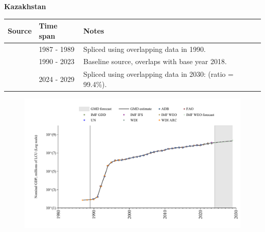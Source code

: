 \documentclass[12pt,a4paper,landscape]{article}
\begin{document}
\begin{adjustbox}{max totalsize={\paperwidth}{\paperheight},center}
\begin{minipage}[t][\textheight][t]{\textwidth}
\vspace*{0.5cm}
{}
\begin{center}
{\Large\bfseries Kazakhstan}
\end{center}
\vspace{0.5cm}
\begin{table}[H]
\centering
\small
\begin{tabular}{|l|l|l|}
\hline
\textbf{Source} & \textbf{Time span} & \textbf{Notes} \\
\hline
\rowcolor{white}\cite{WDI_ARC}& 1987 - 1989 &Spliced using overlapping data in 1990.\\
\rowcolor{lightgray}\cite{WDI}& 1990 - 2023 &Baseline source, overlaps with base year 2018.\\
\rowcolor{white}\cite{IMF_WEO_forecast}& 2024 - 2029 &Spliced using overlapping data in 2030: (ratio = 99.4\%).\\
\hline
\end{tabular}
\end{table}
\begin{figure}[H]
\centering
\includegraphics[width=\textwidth,height=0.6\textheight,keepaspectratio]{graphs/KAZ_nGDP.pdf}
\end{figure}
\end{minipage}
\end{adjustbox}
\end{document}
